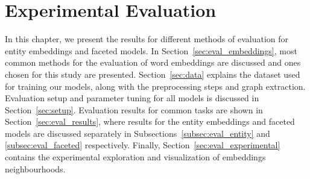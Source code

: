 \chapter{Experimental Evaluation}
\label{chap:eval}
In this chapter, we present the results for different methods of evaluation for entity embeddings and faceted models. In Section~\ref{sec:eval_embeddings}, most common methods for the evaluation of word embeddings are discussed and ones chosen for this study are presented. Section~\ref{sec:data} explains the dataset used for training our models, along with the preprocessing steps and graph extraction. Evaluation setup and parameter tuning for all models is discussed in Section~\ref{sec:setup}. Evaluation results for common tasks are shown in Section~\ref{sec:eval_results}, where results for the entity embeddings and faceted models are discussed separately in Subsections~\ref{subsec:eval_entity} and \ref{subsec:eval_faceted} respectively. Finally, Section~\ref{sec:eval_experimental} contains the experimental exploration and visualization of embeddings neighbourhoods. 
